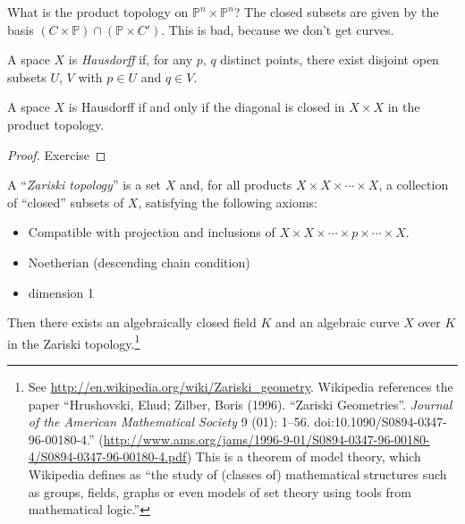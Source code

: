 \documentclass [letterpaper,11pt,twoside]{article}
\begin{document}
  What is the product topology on $\mathbb P^n \times \mathbb P^n$?  The closed subsets are given by the basis $(C \times \mathbb P) \cap (\mathbb P\times C')$.  This is bad, because we don't get curves.

  \begin{defn*}
    A space $X$ is \emph{Hausdorff} if, for any $p$, $q$ distinct points, there exist disjoint open subsets $U$, $V$ with $p\in U$ and $q\in V$.
  \end{defn*}

  \begin{prop*}
    A space $X$ is Hausdorff if and only if the diagonal is closed in $X \times X$ in the product topology.
  \end{prop*}
  \begin{proof}
    Exercise
  \end{proof}

  \begin{thm*}
    A ``\emph{Zariski topology}'' is a set $X$ and, for all products $X\times X \times \cdots \times X$, a collection of ``closed'' subsets of $X$, satisfying the following axioms:
    \begin{itemize}
      \item Compatible with projection and inclusions of $X\times X\times \cdots \times p \times \cdots \times X$.
      \item Noetherian (descending chain condition)
      \item dimension 1
    \end{itemize}

    Then there exists an algebraically closed field $K$ and an algebraic curve $X$ over $K$ in the Zariski topology.\footnote{See \url{http://en.wikipedia.org/wiki/Zariski\_geometry}.  Wikipedia references the paper ``Hrushovski, Ehud; Zilber, Boris (1996). ``Zariski Geometries''. \emph{Journal of the American Mathematical Society} 9 (01): 1–56. doi:10.1090/S0894-0347-96-00180-4.'' (\url{http://www.ams.org/jams/1996-9-01/S0894-0347-96-00180-4/S0894-0347-96-00180-4.pdf})  This is a theorem of model theory, which Wikipedia defines as ``the study of (classes of) mathematical structures such as groups, fields, graphs or even models of set theory using tools from mathematical logic.''}
  \end{thm*}
\end{document}
